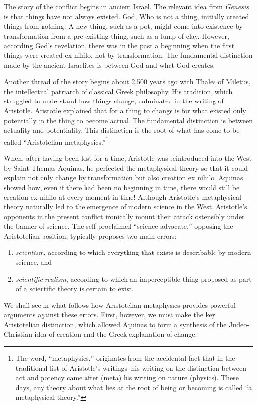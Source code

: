 \documentclass{article}
\begin{document}
The story of the conflict begins in ancient Israel.  The relevant idea from
{\it Genesis} is that things have not always existed.  God, Who is not a thing,
initially created things from nothing.  A new thing, such as a pot, might come
into existence by transformation from a pre-existing thing, such as a lump of
clay.  However, according God's revelation, there was in the past a beginning
when the first things were created ex nihilo, not by transformation.  The
fundamental distinction made by the ancient Israelites is between God and what
God creates.

Another thread of the story begins about 2,500 years ago with Thales of
Miletus, the intellectual patriarch of classical Greek philosophy.  His
tradition, which struggled to understand how things change, culminated in the
writing of Aristotle.  Aristotle explained that for a thing to change is for
what existed only potentially in the thing to become actual.  The fundamental
distinction is between actuality and potentiality.  This distinction is the
root of what has come to be called ``Aristotelian metaphysics.''\footnote{%
   The word, ``metaphysics,'' originates from the accidental fact that in the
   traditional list of Aristotle's writings, his writing on the distinction
   between act and potency came after (meta) his writing on nature (physics).
   These days, any theory about what lies at the root of being or becoming is
   called ``a metaphysical theory.''%
}

When, after having been lost for a time, Aristotle was reintroduced into the
West by Saint Thomas Aquinas, he perfected the metaphysical theory so that it
could explain not only change by transformation but also creation ex nihilo.
Aquinas showed how, even if there had been no beginning in time, there would
still be creation ex nihilo at every moment in time!  Although Aristotle's
metaphysical theory naturally led to the emergence of modern science in the
West, Aristotle's opponents in the present conflict ironically mount their
attack ostensibly under the banner of science.  The self-proclaimed ``science
advocate,'' opposing the Aristotelian position, typically proposes two main
errors:
\begin{enumerate}
   \item \emph{scientism}, according to which everything that exists is
      describable by modern science, and
   \item \emph{scientific realism}, according to which an imperceptible thing
      proposed as part of a scientific theory is certain to exist.
\end{enumerate}
We shall see in what follows how Aristotelian metaphysics provides powerful
arguments against these errors.  First, however, we must make the key
Aristotelian distinction, which allowed Aquinas to form a synthesis of the
Judeo-Christian idea of creation and the Greek explanation of change.
\end{document}
